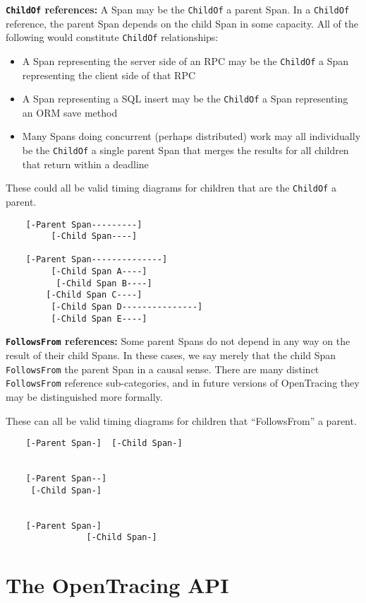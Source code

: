 \documentclass[a4paper,12pt,notitlepage,twoside,openright]{article}
\begin{document}
\textbf{\texttt{ChildOf} references:} A Span may be the \texttt{ChildOf}
a parent Span. In a \texttt{ChildOf} reference, the parent Span depends
on the child Span in some capacity. All of the following would
constitute \texttt{ChildOf} relationships:

\begin{itemize}

\item
  A Span representing the server side of an RPC may be the
  \texttt{ChildOf} a Span representing the client side of that RPC
\item
  A Span representing a SQL insert may be the \texttt{ChildOf} a Span
  representing an ORM save method
\item
  Many Spans doing concurrent (perhaps distributed) work may all
  individually be the \texttt{ChildOf} a single parent Span that merges
  the results for all children that return within a deadline
\end{itemize}

These could all be valid timing diagrams for children that are the
\texttt{ChildOf} a parent.

\begin{verbatim}
    [-Parent Span---------]
         [-Child Span----]

    [-Parent Span--------------]
         [-Child Span A----]
          [-Child Span B----]
        [-Child Span C----]
         [-Child Span D---------------]
         [-Child Span E----]
\end{verbatim}

\textbf{\texttt{FollowsFrom} references:} Some parent Spans do not
depend in any way on the result of their child Spans. In these cases, we
say merely that the child Span \texttt{FollowsFrom} the parent Span in a
causal sense. There are many distinct \texttt{FollowsFrom} reference
sub-categories, and in future versions of OpenTracing they may be
distinguished more formally.

These can all be valid timing diagrams for children that ``FollowsFrom''
a parent.

\begin{verbatim}
    [-Parent Span-]  [-Child Span-]


    [-Parent Span--]
     [-Child Span-]


    [-Parent Span-]
                [-Child Span-]
\end{verbatim}

\hypertarget{the-opentracing-api}{%
\section{The OpenTracing API}\label{the-opentracing-api}}
\end{document}
